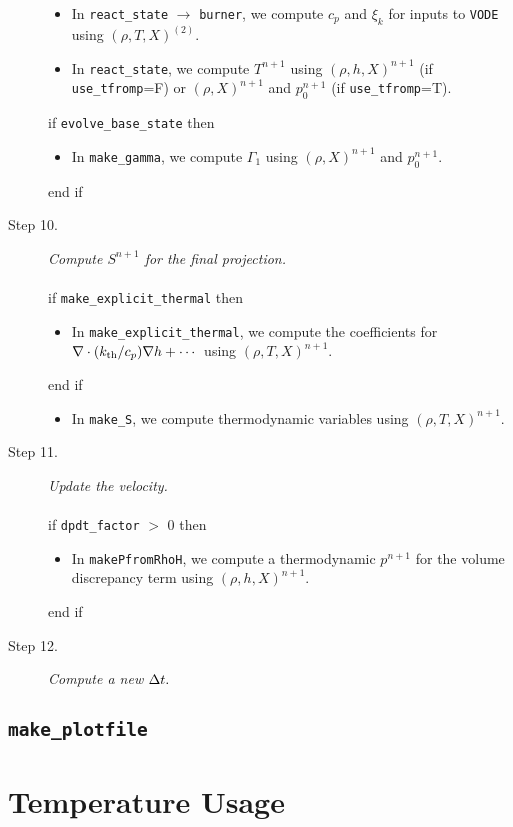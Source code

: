 \begin{description}
\begin{itemize}
\item In {\tt react\_state} $\rightarrow$ {\tt burner}, we compute $c_p$ and $\xi_k$ 
for inputs to {\tt VODE} using $(\rho,T,X)^{(2)}$.
\item In {\tt react\_state}, we compute $T^{n+1}$ using $(\rho,h,X)^{n+1}$ 
(if {\tt use\_tfromp}=F) or $(\rho,X)^{n+1}$ and $p_0^{n+1}$ (if {\tt use\_tfromp}=T).
\end{itemize}
if {\tt evolve\_base\_state} then
\begin{itemize}
\item In {\tt make\_gamma}, we compute $\Gamma_1$ using $(\rho,X)^{n+1}$ and $p_0^{n+1}$.
\end{itemize}
end if
\item[Step 10.] {\em Compute $S^{n+1}$ for the final projection.}\\ \\
if {\tt make\_explicit\_thermal} then
\begin{itemize}
\item In {\tt make\_explicit\_thermal}, we compute the coefficients for 
$\nabla\cdot(k_{\rm th}/c_p)\nabla h + \cdots$ using $(\rho,T,X)^{n+1}$.
\end{itemize}
end if
\begin{itemize}
\item In {\tt make\_S}, we compute thermodynamic variables using $(\rho,T,X)^{n+1}$.
\end{itemize}
\item[Step 11.] {\em Update the velocity.}\\ \\
if {\tt dpdt\_factor} $>$ 0 then
\begin{itemize}
\item In {\tt makePfromRhoH}, we compute a thermodynamic $p^{n+1}$ for the volume 
discrepancy term using $(\rho,h,X)^{n+1}$.
\end{itemize}
end if
\item[Step 12.] {\em Compute a new $\Delta t.$}
\end{description}
\subsection{{\tt make\_plotfile}}
\section{Temperature Usage}
